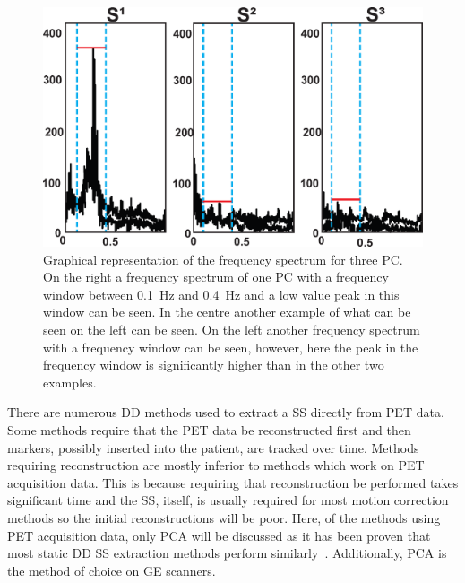                 \begin{figure}
                    \centering
                        
                    \includegraphics[width=1.0\linewidth]{figures/background_pca_window.png}
                        
                    \captionsetup{singlelinecheck=false, justification=raggedright}
                    \caption{Graphical representation of the frequency spectrum for three \gls{PC}. On the right a frequency spectrum of one \gls{PC} with a frequency window between \SI{0.1}{\hertz} and \SI{0.4}{\hertz} and a low value peak in this window can be seen. In the centre another example of what can be seen on the left can be seen. On the left another frequency spectrum with a frequency window can be seen, however, here the peak in the frequency window is significantly higher than in the other two examples.} \label{fig:data_driven_pca_window}
                \end{figure}
                
                There are numerous \gls{DD} methods used to extract a \gls{SS} directly from \gls{PET} data. Some methods require that the \gls{PET} data be reconstructed first and then markers, possibly inserted into the patient, are tracked over time. Methods requiring reconstruction are mostly inferior to methods which work on \gls{PET} acquisition data. This is because requiring that reconstruction be performed takes significant time and the \gls{SS}, itself, is usually required for most motion correction methods so the initial reconstructions will be poor. Here, of the methods using \gls{PET} acquisition data, only \gls{PCA} will be discussed as it has been proven that most static \gls{DD} \gls{SS} extraction methods perform similarly~\parencite{Thielemans2013ComparisonData}. Additionally, \gls{PCA} is the method of choice on \gls{GE} scanners.
                
